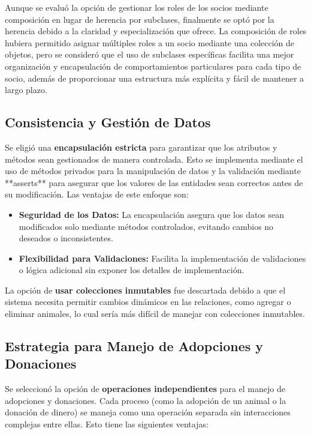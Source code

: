 Aunque se evaluó la opción de gestionar los roles de los socios mediante composición en lugar de herencia por subclases, finalmente se optó por la herencia debido a la claridad y especialización que ofrece. La composición de roles hubiera permitido asignar múltiples roles a un socio mediante una colección de objetos, pero se consideró que el uso de subclases específicas facilita una mejor organización y encapsulación de comportamientos particulares para cada tipo de socio, además de proporcionar una estructura más explícita y fácil de mantener a largo plazo.

\subsection{Consistencia y Gestión de Datos}

Se eligió una \textbf{encapsulación estricta} para garantizar que los atributos y métodos sean gestionados de manera controlada. Esto se implementa mediante el uso de métodos privados para la manipulación de datos y la validación mediante **asserts** para asegurar que los valores de las entidades sean correctos antes de su modificación. Las ventajas de este enfoque son:

\begin{itemize}
    \item \textbf{Seguridad de los Datos:} La encapsulación asegura que los datos sean modificados solo mediante métodos controlados, evitando cambios no deseados o inconsistentes.
    \item \textbf{Flexibilidad para Validaciones:} Facilita la implementación de validaciones o lógica adicional sin exponer los detalles de implementación.
\end{itemize}

La opción de\textbf{ usar colecciones inmutables} fue descartada debido a que el sistema necesita permitir cambios dinámicos en las relaciones, como agregar o eliminar animales, lo cual sería más difícil de manejar con colecciones inmutables.

\subsection{Estrategia para Manejo de Adopciones y Donaciones}

Se seleccionó la opción de \textbf{operaciones independientes} para el manejo de adopciones y donaciones. Cada proceso (como la adopción de un animal o la donación de dinero) se maneja como una operación separada sin interacciones complejas entre ellas. Esto tiene las siguientes ventajas:

